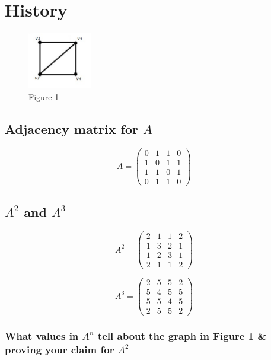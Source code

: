 \documentclass[12pt]{scrreprt}
\begin{document}
\tableofcontents 

\chapter{History}

\begin{figure}[h]
	
	\centering
		\includegraphics[width=0.25\textwidth]{figure1}
	\caption{Figure 1}

\end{figure}

\section{Adjacency matrix for $A$} 

\[ A = \left( \begin{array}{cccc}
0 & 1 & 1 & 0 \\
1 & 0 & 1 & 1 \\
1 & 1 & 0 & 1 \\
0 & 1 & 1 & 0 \end{array} \right)\] 

\section{$A^2$ and $A^3$}

\[ A^2 = \left( \begin{array}{cccc}
2 & 1 & 1 & 2 \\
1 & 3 & 2 & 1 \\
1 & 2 & 3 & 1 \\
2 & 1 & 1 & 2 \end{array} \right)\] 

\[ A^3 = \left( \begin{array}{cccc}
2 & 5 & 5 & 2 \\
5 & 4 & 5 & 5 \\
5 & 5 & 4 & 5 \\
2 & 5 & 5 & 2 \end{array} \right)\] 

\pagebreak

\subsection{What values in $A^n$ tell about the graph in Figure 1 & proving your claim for $A^2$} 
\end{document}
